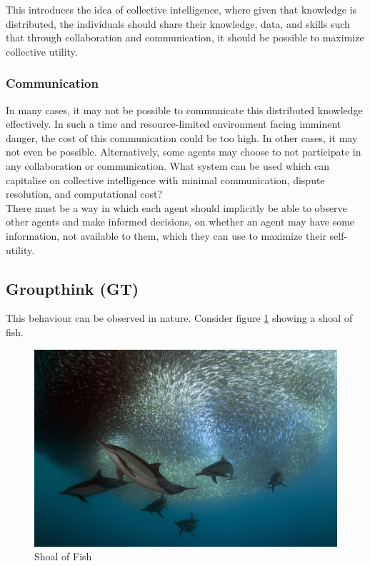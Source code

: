 This introduces the idea of collective intelligence, where given that knowledge is distributed, the  individuals should share their knowledge, data, and skills such that through collaboration and communication, it should be possible to maximize collective utility.

\subsubsection{Communication}
In many cases, it may not be possible to communicate this distributed knowledge effectively. In such a time and resource-limited environment facing imminent danger, the cost of this communication could be too high. In other cases, it may not even be possible. Alternatively, some agents may choose to not participate in any collaboration or communication.  What system can be used which can capitalise on collective intelligence with minimal communication, dispute resolution, and computational cost? \\ 

There must be a way in which each agent should implicitly be able to observe other agents and make informed decisions, on whether an agent may have some information, not available to them, which they can use to maximize their self-utility.

\subsection{Groupthink (GT)}
This behaviour can be observed in nature. Consider figure \ref{fig:T6Fish} showing a shoal of fish. \\

\begin{figure}[h]           %
	\centering				%
	\includegraphics[scale = 0.1]{fish.jpg}			%
    \caption{Shoal of Fish}
	\label{fig:T6Fish}			%
\end{figure}

